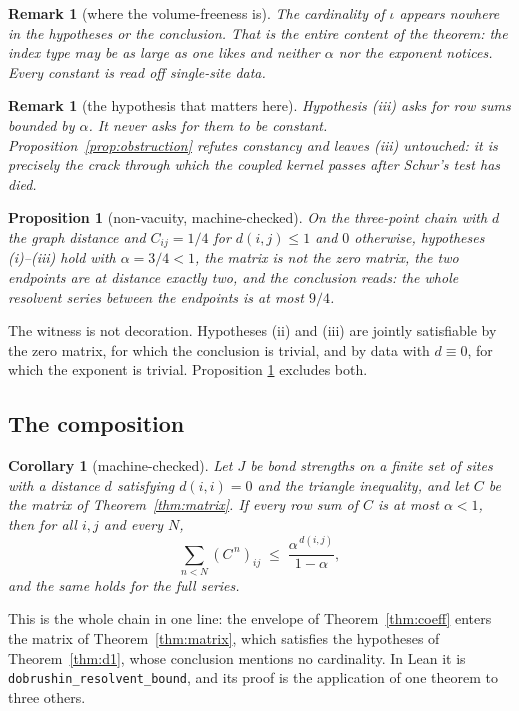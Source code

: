\documentclass[11pt]{article}
\newtheorem{proposition}[theorem]{Proposition}
\newtheorem{corollary}[theorem]{Corollary}
\newtheorem{remark}[theorem]{Remark}
\theoremstyle{definition}
\begin{document}
\begin{remark}[where the volume-freeness is]
The cardinality of $\iota$ appears nowhere in the hypotheses or the conclusion.
That is the entire content of the theorem: the index type may be as large as one
likes and neither $\alpha$ nor the exponent notices.  Every constant is read off
single-site data.
\end{remark}

\begin{remark}[the hypothesis that matters here]
\label{rem:crack}
Hypothesis (iii) asks for row sums \emph{bounded} by $\alpha$.  It never asks for
them to be constant.  Proposition~\ref{prop:obstruction} refutes constancy and
leaves (iii) untouched: it is precisely the crack through which the coupled
kernel passes after Schur's test has died.
\end{remark}

\begin{proposition}[non-vacuity, machine-checked]
\label{prop:nonvacuity}
On the three-point chain with $d$ the graph distance and $C_{ij}=1/4$ for
$d(i,j)\le1$ and $0$ otherwise, hypotheses (i)--(iii) hold with $\alpha=3/4<1$,
the matrix is not the zero matrix, the two endpoints are at distance exactly
two, and the conclusion reads: the whole resolvent series between the endpoints
is at most $9/4$.
\end{proposition}

The witness is not decoration.  Hypotheses (ii) and (iii) are jointly
satisfiable by the zero matrix, for which the conclusion is trivial, and by data
with $d\equiv0$, for which the exponent is trivial.  Proposition
\ref{prop:nonvacuity} excludes both.

\subsection{The composition}

\begin{corollary}[machine-checked]
\label{cor:chain}
Let $J$ be bond strengths on a finite set of sites with a distance $d$ satisfying
$d(i,i)=0$ and the triangle inequality, and let $C$ be the matrix of
Theorem~\ref{thm:matrix}.  If every row sum of $C$ is at most $\alpha<1$, then
for all $i,j$ and every $N$,
\[
  \sum_{n<N}(C^{\,n})_{ij}\;\le\;\frac{\alpha^{\,d(i,j)}}{1-\alpha},
\]
and the same holds for the full series.
\end{corollary}

This is the whole chain in one line: the envelope of
Theorem~\ref{thm:coeff} enters the matrix of Theorem~\ref{thm:matrix}, which
satisfies the hypotheses of Theorem~\ref{thm:d1}, whose conclusion mentions no
cardinality.  In Lean it is \texttt{dobrushin\_resolvent\_bound}, and its proof
is the application of one theorem to three others.
\end{document}
